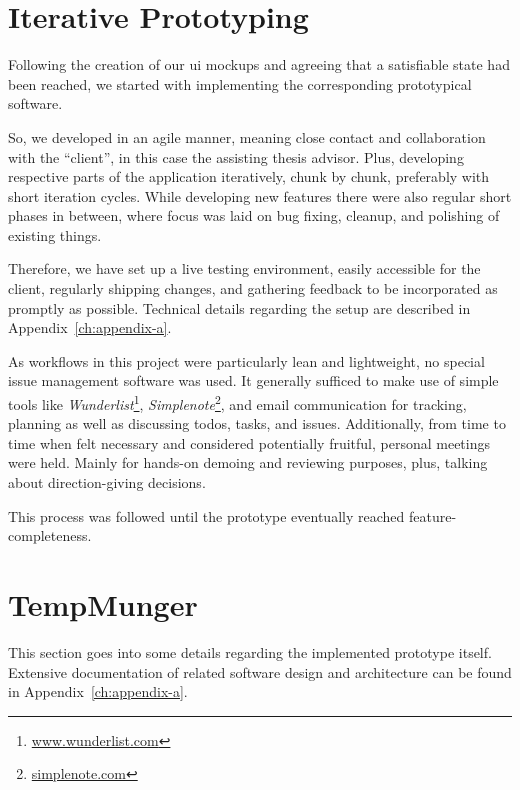 \section{Iterative Prototyping}

Following the creation of our \gls{ui} mockups and agreeing that a satisfiable state had been reached, we started with implementing the corresponding prototypical software.

So, we developed in an agile manner, meaning close contact and collaboration with the ``client'', in this case the assisting thesis advisor.
Plus, developing respective parts of the application iteratively, chunk by chunk, preferably with short iteration cycles.
While developing new features there were also regular short phases in between, where focus was laid on bug fixing, cleanup, and polishing of existing things.

Therefore, we have set up a live testing environment, easily accessible for the client, regularly shipping changes, and gathering feedback to be incorporated as promptly as possible.
Technical details regarding the setup are described in Appendix~\ref{ch:appendix-a}.

As workflows in this project were particularly lean and lightweight, no special issue management software was used.
It generally sufficed to make use of simple tools like \emph{Wunderlist}\footnote{\textcolor{blue}{\href{https://www.wunderlist.com/}{www.wunderlist.com}}}, \emph{Simplenote}\footnote{\textcolor{blue}{\href{https://simplenote.com/}{simplenote.com}}}, and email communication for tracking, planning as well as discussing todos, tasks, and issues.
Additionally, from time to time when felt necessary and considered potentially fruitful, personal meetings were held.
Mainly for hands-on demoing and reviewing purposes, plus, talking about direction-giving decisions.

This process was followed until the prototype eventually reached feature-completeness.


\section{TempMunger}

This section goes into some details regarding the implemented prototype itself.
Extensive documentation of related software design and architecture can be found in Appendix~\ref{ch:appendix-a}.


